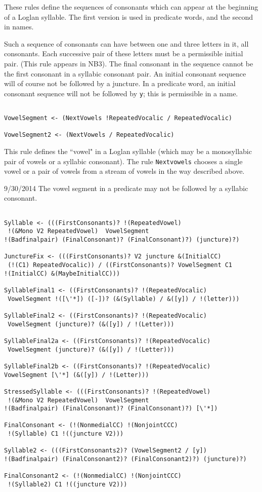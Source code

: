 \documentclass[12pt]{article}
\begin{document}
These rules define the sequences of consonants which can appear at the beginning of a Loglan syllable.
The first version is used in predicate words, and the second in names.

Such a sequence of consonants can have between one and three letters in it, all consonants.  Each successive pair
of these letters must be a permissible initial pair.  (This rule appears in NB3).  The final consonant in the sequence
cannot be the first consonant in a syllabic consonant pair.  An initial consonant sequence will of course not be followed by a juncture.  In a predicate word, an initial consonant sequence will not be followed by {\tt y}; this is permissible in a name.

\begin{verbatim}

VowelSegment <- (NextVowels !RepeatedVocalic / RepeatedVocalic)

VowelSegment2 <- (NextVowels / RepeatedVocalic)

\end{verbatim}

This rule defines the ``vowel" in a Loglan syllable (which may be a monosyllabic pair of vowels or a syllabic consonant).
The rule {\tt Nextvowels} chooses a single vowel or a pair of vowels from a stream of vowels in the way described above.

9/30/2014  The vowel segment in a predicate may not be followed by a syllabic consonant.

\begin{verbatim}

Syllable <- (((FirstConsonants)? !(RepeatedVowel)
 !(&Mono V2 RepeatedVowel)  VowelSegment 
!(Badfinalpair) (FinalConsonant)? (FinalConsonant)?) (juncture)?)

JunctureFix <- (((FirstConsonants)? V2 juncture &(InitialCC)
 (!(C1) RepeatedVocalic)) / ((FirstConsonants)? VowelSegment C1 
!(InitialCC) &(MaybeInitialCC)))

SyllableFinal1 <- ((FirstConsonants)? !(RepeatedVocalic)
 VowelSegment !([\'*]) ([-])? (&(Syllable) / &([y]) / !(letter)))

SyllableFinal2 <- ((FirstConsonants)? !(RepeatedVocalic)
 VowelSegment (juncture)? (&([y]) / !(Letter)))

SyllableFinal2a <- ((FirstConsonants)? !(RepeatedVocalic)
 VowelSegment (juncture)? (&([y]) / !(Letter)))

SyllableFinal2b <- ((FirstConsonants)? !(RepeatedVocalic) 
VowelSegment [\'*] (&([y]) / !(Letter)))

StressedSyllable <- (((FirstConsonants)? !(RepeatedVowel)
 !(&Mono V2 RepeatedVowel)  VowelSegment 
!(Badfinalpair) (FinalConsonant)? (FinalConsonant)?) [\'*])

FinalConsonant <- (!(NonmedialCC) !(NonjointCCC)
 !(Syllable) C1 !((juncture V2)))

Syllable2 <- (((FirstConsonants2)? (VowelSegment2 / [y]) 
!(Badfinalpair) (FinalConsonant2)? (FinalConsonant2)?) (juncture)?)

FinalConsonant2 <- (!(NonmedialCC) !(NonjointCCC)
 !(Syllable2) C1 !((juncture V2)))

\end{verbatim}
\end{document}
